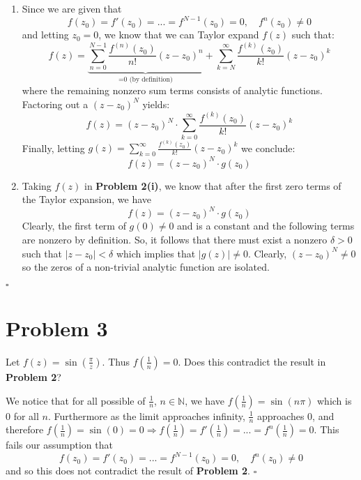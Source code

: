 \documentclass[11pt]{article}
\newcommand{\N}{\mathbb{N}}
\newenvironment{proof}{\noindent{\bf Proof.}}{\hfill $\square$\medskip}
\begin{document}
\begin{proof}
    \begin{enumerate}[label=\textbf{(\roman*)}]
        \item Since we are given that
              $$f(z_{0})=f'(z_{0})=...=f^{N-1}(z_{0})=0,\quad f^{n}(z_{0})\neq0$$
              and letting $z_{0} =0$, we know that we can Taylor expand $f(z)$ such that:
              $$f(z)=\underbrace{\sum_{n=0}^{N-1}\frac{f^{(n)}(z_{0})}{n!}(z-z_{0})^{n}}_\text{=0 (by definition)}+\sum_{k=N}^{\infty}\frac{f^{(k)}(z_{0})}{k!}(z-z_{0})^{k}$$
              where the remaining nonzero sum terms consists of analytic functions. Factoring out a $(z-z_{0})^{N}$ yields:
              $$f(z)=(z-z_{0})^{N}\cdot\sum_{k=0}^{\infty}\frac{f^{(k)}(z_{0})}{k!}(z-z_{0})^{k}$$
              Finally, letting $g(z)=\sum_{k=0}^{\infty}\frac{f^{(k)}(z_{0})}{k!}(z-z_{0})^{k}$ we conclude:
              $$f(z)=(z-z_{0})^{N}\cdot g(z_{0})$$
        \item Taking $f(z)$ in \textbf{Problem 2(i)}, we know that after the first zero terms of the Taylor expansion, we have
              $$f(z)=(z-z_{0})^{N}\cdot g(z_{0})$$
              Clearly, the first term of $g(0)\neq 0$ and is a constant and the following terms are nonzero by definition. So, it follows that there must exist a nonzero $\delta>0$ such that $\left|z-z_{0}\right|<\delta$ which implies that $\left|g(z)\right|\neq0$. Clearly, $(z-z_{0})^{N}\neq0$ so the zeros of a non-trivial analytic function are isolated.
    \end{enumerate}
\end{proof}


\newpage
\section{Problem 3}
Let $f(z)=\sin(\frac{\pi}{z})$. Thus $f(\frac{1}{n})=0$. Does this contradict the result in \textbf{Problem 2}?

\begin{proof}
    We notice that for all possible of $\frac{1}{n}$, $n\in\N$, we have $f(\frac{1}{n})=\sin(n\pi)$ which is $0$ for all $n$. Furthermore as the limit approaches infinity, $\frac{1}{n}$ approaches $0$, and therefore $f(\frac{1}{n})=\sin(0)=0\Rightarrow f(\frac{1}{n})=f'(\frac{1}{n})=...=f^{n}(\frac{1}{n})=0$. This fails our assumption that
    $$f(z_{0})=f'(z_{0})=...=f^{N-1}(z_{0})=0,\quad f^{n}(z_{0})\neq0$$
    and so this does not contradict the result of \textbf{Problem 2}.
\end{proof}
\end{document}
